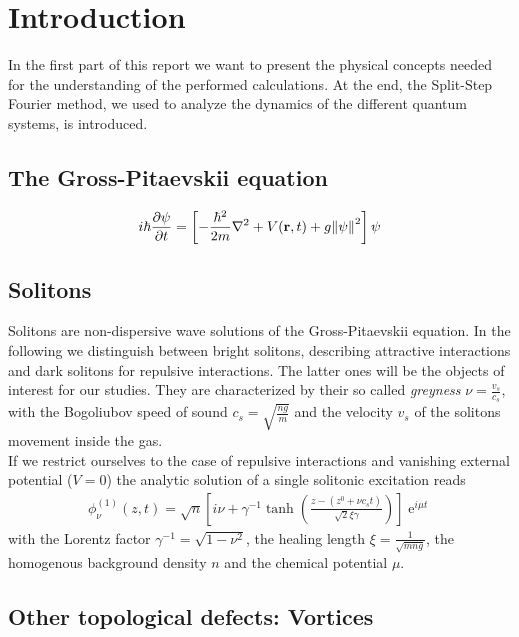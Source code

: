 \section{Introduction}
In the first part of this report we want to present the physical concepts needed for the understanding of the performed calculations. At the end, the Split-Step Fourier method, we used to analyze the dynamics of the different quantum systems, is introduced.

\subsection{The Gross-Pitaevskii equation}

\begin{align}
	i\hbar \frac{\partial\psi}{\partial t} = \left[-\frac{\hbar^2}{2m}\nabla^2 + V(\mathbf{r}, t) + g\norm{\psi}^2\right]\psi
\end{align}


\subsection{Solitons}
Solitons are non-dispersive wave solutions of the Gross-Pitaevskii equation. In the following we distinguish between bright solitons, describing attractive interactions and dark solitons for repulsive interactions. The latter ones will be the objects of interest for our studies. They are characterized by their so called \textit{greyness} $\nu = \frac{v_s}{c_s}$, with the Bogoliubov speed of sound $c_s = \sqrt{\frac{ng}{m}}$ and the velocity $v_s$ of the solitons movement inside the gas. \\
If we restrict ourselves to the case of repulsive interactions and vanishing external potential ($V=0$) the analytic solution of a single solitonic excitation reads 
\begin{align}
	\phi_{\nu}^{(1)}(z,t) = \sqrt{n}\left[ i\nu + \gamma^{-1}\tanh\left(\frac{z - (z^0 + \nu c_s t)}{\sqrt{2}\xi\gamma}\right) \right]\operatorname{e}^{i\mu t}
\end{align}
with the Lorentz factor $\gamma^{-1} = \sqrt{1 - \nu^2}$, the healing length $\xi = \frac{1}{\sqrt{mng}}$, the homogenous background density $n$ and the chemical potential $\mu$.


\subsection{Other topological defects: Vortices}

